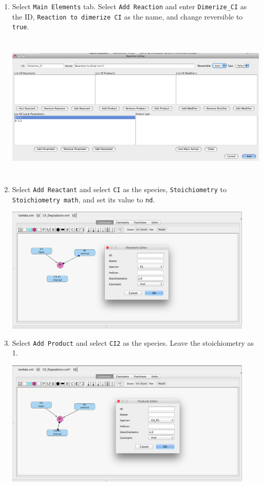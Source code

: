\documentclass[titlepage,11pt]{article}
\begin{document}
\begin{enumerate}
\item Select {\tt Main Elements} tab.  Select {\tt Add Reaction} and
  enter {\tt Dimerize\_CI} as the ID, {\tt Reaction to dimerize CI} as
  the name, and change reversible to {\tt true}.

\includegraphics[height=70mm]{screenshots/reaction}

\item Select {\tt Add Reactant} and select {\tt CI} as the species,
      {\tt Stoichiometry} to {\tt Stoichiometry math}, and set its
      value to {\tt nd}.

\includegraphics[height=60mm]{screenshots/reactant}

\item Select {\tt Add Product} and select {\tt CI2} as the species.
      Leave the stoichiometry as 1.

\includegraphics[height=60mm]{screenshots/product}


\end{enumerate}
\end{document}
